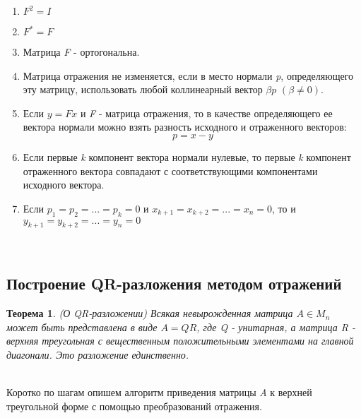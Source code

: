 \documentclass[14pt, titlepage, a4paper]{extarticle} %
\newtheorem{theorem}{Теорема}
\begin{document}
	\begin{enumerate}
		\item $F^2 = I$
		\item $F^* = F$
		\item Матрица \textit{F} - ортогональна.
		\item Матрица отражения не изменяется, если в место нормали \textit{p}, определяющего эту матрицу, использовать любой коллинеарный вектор $\beta p$ $(\beta \neq 0)$.
		\item Если $y=Fx$ и \textit{F} - матрица отражения, то в качестве определяющего ее вектора нормали можно взять разность исходного и отраженного векторов:
		$$p = x - y$$
		\item Если первые \textit{k} компонент вектора нормали нулевые, то первые \textit{k} компонент отраженного вектора совпадают с соответствующими компонентами исходного вектора.
		\item Если $p_1 = p_2 = ... = p_k = 0$ и $x_{k+1} = x_{k+2} =...= x_n = 0$, то и $y_{k+1} = y_{k+2} =...=y _n = 0$ 
	\end{enumerate}
	
	
	
	~\\
	\subsection*{Построение QR-разложения методом отражений}
	
	\begin{theorem}\label{th:1}(О QR-разложении)
		Всякая невырожденная матрица $A\in M_n$ может быть представлена в виде $A = QR$, где Q - унитарная, а матрица R - верхняя треугольная с вещественным положительными элементами на главной диагонали. Это разложение единственно.
	\end{theorem}
	~\\
	Коротко по шагам опишем алгоритм приведения матрицы \textit{A} к верхней треугольной форме с помощью преобразований отражения.
	
\end{document}
